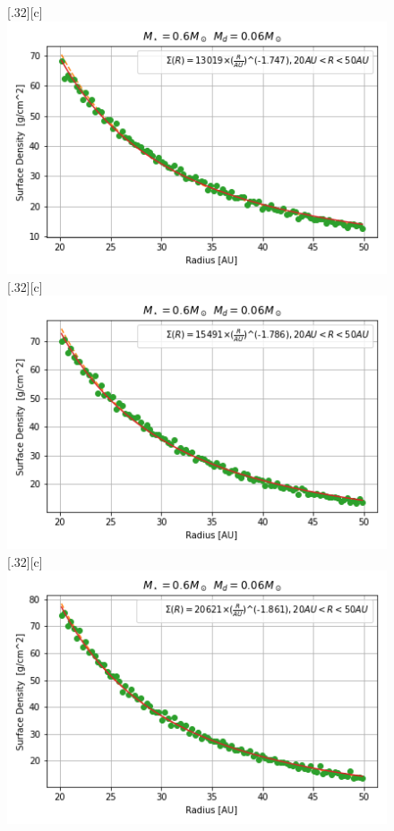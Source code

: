 \documentclass[aps,prb,twocolumn,superscriptaddress,floatfix,longbibliography]{revtex4-2}
\begin{document}
\begin{appendices}
\begin{figure}[!htbp]
  \subcaptionbox*{}[.32\linewidth][c]{%
    \includegraphics[width=\linewidth]{Graphs_1D/r_0.6s_0.06d_0.3q_1D.png}}\quad
  \subcaptionbox*{}[.32\linewidth][c]{%
    \includegraphics[width=\linewidth]{Graphs_1D/r_0.6s_0.06d_0.5q_1D.png}}\quad
  \subcaptionbox*{}[.32\linewidth][c]{%
    \includegraphics[width=\linewidth]{Graphs_1D/r_0.6s_0.06d_0.7q_1D.png}}\quad

\end{figure}
\end{appendices}
\end{document}
